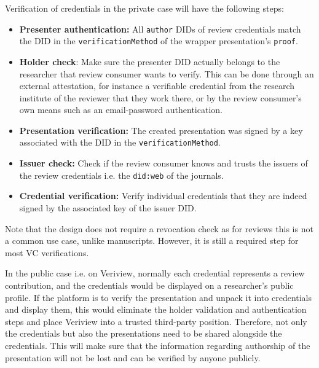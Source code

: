 Verification of credentials in the private case will have the following steps:
\begin{itemize}
    \item \textbf{Presenter authentication:} All \lstinline{author} \acrshort{DID}s of review credentials match the \acrshort{DID} in the \lstinline{verificationMethod} of the wrapper presentation's \lstinline{proof}.
    
    \item \textbf{Holder check}: Make sure the presenter \acrshort{DID} actually belongs to the researcher that review consumer wants to verify. This can be done through an external attestation, for instance a verifiable credential from the research institute of the reviewer that they work there, or by the review consumer's own means such as an email-password authentication. 
    
    \item \textbf{Presentation verification:} The created presentation was signed by a key associated with the \acrshort{DID} in the \lstinline{verificationMethod}.
    
    \item \textbf{Issuer check:} Check if the review consumer knows and trusts the issuers of the review credentials i.e. the \lstinline{did:web} of the journals.
    
    \item \textbf{Credential verification:} Verify individual credentials that they are indeed signed by the associated key of the issuer \acrshort{DID}.
\end{itemize}

Note that the design does not require a revocation check as for reviews this is not a common use case, unlike manuscripts. However, it is still a required step for most \acrshort{VC} verifications.

In the public case i.e. on Veriview, normally each credential represents a review contribution, and the credentials would be displayed on a researcher's public profile. If the platform is to verify the presentation and unpack it into credentials and display them, this would eliminate the holder validation and authentication steps and place Veriview into a trusted third-party position. Therefore, not only the credentials but also the presentations need to be shared alongside the credentials. This will make sure that the information regarding authorship of the presentation will not be lost and can be verified by anyone publicly. 

